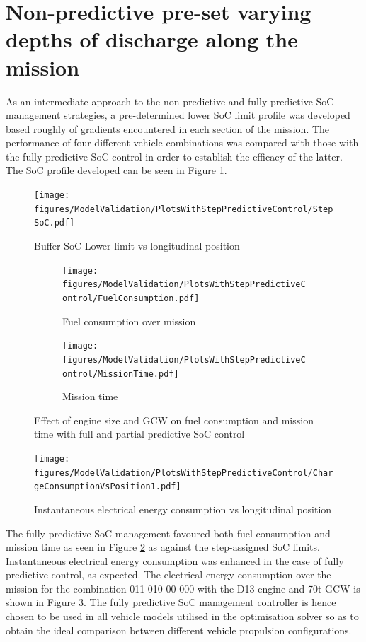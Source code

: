 \documentclass[ExampleMasters.tex]{subfiles}
\begin{document}
	\section{Non-predictive pre-set varying depths of discharge along the mission}
	As an intermediate approach to the non-predictive and fully predictive SoC management strategies, a pre-determined lower SoC limit profile was developed based roughly of gradients encountered in each section of the mission. The performance of four different vehicle combinations was compared with those with the fully predictive SoC control in order to establish the efficacy of the latter. The SoC profile developed can be seen in Figure \ref{stepSoC}.\\
	\begin{figure}
	\centering
	\texttt{[image: figures/ModelValidation/PlotsWithStepPredictiveControl/StepSoC.pdf]}
	\caption{Buffer SoC Lower limit vs longitudinal position}
	\label{stepSoC}
	\end{figure}
	\begin{figure}
	\begin{subfigure}{.5\textwidth}
	\centering
	\texttt{[image: figures/ModelValidation/PlotsWithStepPredictiveControl/FuelConsumption.pdf]}
	\caption{Fuel consumption over mission}
	\end{subfigure}
	\begin{subfigure}{.5\textwidth}
	\centering
	\texttt{[image: figures/ModelValidation/PlotsWithStepPredictiveControl/MissionTime.pdf]}
	\caption{Mission time}
	\end{subfigure}
	\caption{Effect of engine size and GCW on fuel consumption and mission time with full and partial predictive SoC control}
	\label{timeFuelAxleEngineStepSoC}
	\end{figure}

	\begin{figure}
	\centering
	\texttt{[image: figures/ModelValidation/PlotsWithStepPredictiveControl/ChargeConsumptionVsPosition1.pdf]}
	\caption{Instantaneous electrical energy consumption vs longitudinal position}
	\label{electricalEnergyConsumptionStepSoC}
	\end{figure}

	The fully predictive SoC management favoured both fuel consumption and mission time as seen in Figure \ref{timeFuelAxleEngineStepSoC} as against the step-assigned SoC limits. Instantaneous electrical energy consumption was enhanced in the case of fully predictive control, as expected. The electrical energy consumption over the mission for the combination 011-010-00-000 with the D13 engine and 70t GCW is shown in Figure \ref{electricalEnergyConsumptionStepSoC}. The fully predictive SoC management controller is hence chosen to be used in all vehicle models utilised in the optimisation solver so as to obtain the ideal comparison between different vehicle propulsion configurations.
\end{document}
